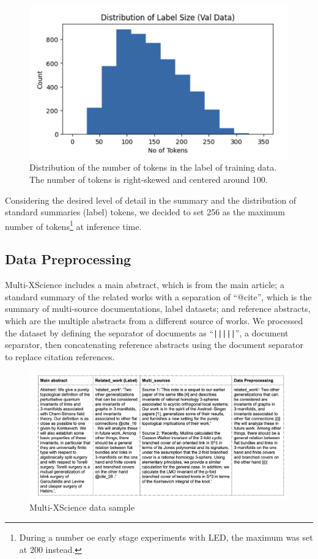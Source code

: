 \documentclass[12pt, twocolumn]{article}
\numberwithin{equation}{section}
\begin{document}
\begin{figure}
    \includegraphics[width=\columnwidth]{label_dist.png}
    \caption{Distribution of the number of tokens in the label of training data. The number of tokens is right-skewed and centered around 100.}
    \label{fig:label-dist}
\end{figure}

Considering the desired level of detail in the summary and the distribution of standard summaries (label) tokens, we decided to set 256 as the maximum number of tokens\footnote{During a number oe early stage experiments with LED, the maximum was set at 200 instead.} at inference time.

\subsection{Data Preprocessing}

Multi-XScience includes a main abstract, which is from the main article; a standard summary of the related works with a separation of ``@cite'', which is the summary of multi-source documentations, label datasets; and reference abstracts, which are the multiple abstracts from a different source of works. We processed the dataset by defining the separator of documents as ``\texttt{|||||}'', a document separator, then concatenating reference abstracts using the document separator to replace citation references. 

\begin{figure}
    \includegraphics[width=\textwidth]{X_science_example.png}
    \caption{Multi-XScience data sample}
\end{figure}
\end{document}
